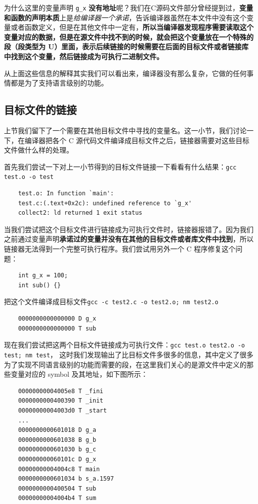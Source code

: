 \documentclass[UTF8,a4paper,12pt]{ctexbook}
\begin{document}
				为什么这里的变量声明 \verb|g_x| \textbf{没有地址}呢？我们在C源码文件部分曾经提到过，\textbf{变量和函数的声明本质}上是\textit{给编译器一个承诺}，告诉编译器虽然在本文件中没有这个变量或者函数定义，但是在其他文件中一定有，\textbf{所以当编译器发现程序需要读取这个变量对应的数据，但是在源文件中找不到的时候，就会把这个变量放在一个特殊的段（段类型为 U）里面，表示后续链接的时候需要在后面的目标文件或者链接库中找到这个变量，然后链接成为可执行二进制文件。}
				
				从上面这些信息的解释其实我们可以看出来，编译器没有那么复杂，它做的任何事情都是为了支持语言级别的功能。
				
			\subsection{目标文件的链接}
				上节我们留下了一个需要在其他目标文件中寻找的变量名。这一小节，我们讨论一下，在编译器把各个 C 源代码文件编译成目标文件之后，链接器需要对这些目标文件做什么样的处理。
				
				首先我们尝试一下对上一小节得到的目标文件链接一下看看有什么结果：\verb|gcc test.o -o test|
				\begin{lstlisting}
	test.o: In function `main':
	test.c:(.text+0x2c): undefined reference to `g_x'
	collect2: ld returned 1 exit status
				\end{lstlisting}
			
				当我们尝试把这个目标文件进行链接成为可执行文件时，链接器报错了。因为我们之前通过变量声明\textbf{承诺过的变量并没有在其他的目标文件或者库文件中找到}，所以链接器无法得到一个完整可执行程序。我们尝试用另外一个 C 程序修复这个问题：
				\begin{lstlisting}
	int g_x = 100;
	int sub() {}
				\end{lstlisting}
				
				把这个文件编译成目标文件\verb|gcc -c test2.c -o test2.o; nm test2.o|
				\begin{lstlisting}
	0000000000000000 D g_x
	0000000000000000 T sub
				\end{lstlisting}
				
				现在我们尝试把这两个目标文件链接成为可执行文件：\verb|gcc test.o test2.o -o test; nm test|， 这时我们发现输出了比目标文件多很多的信息，其中定义了很多为了实现不同语言级别的功能而需要的段，在这里我们关心的是源文件中定义的那些变量对应的 symbol 及其地址，如下图所示：
				\begin{lstlisting}
	00000000004005e8 T _fini
	0000000000400390 T _init
	00000000004003d0 T _start
	...
	0000000000601018 D g_a
	0000000000601038 B g_b
	0000000000601030 b g_c
	000000000060101c D g_x
	00000000004004c8 T main
	0000000000601034 b s_a.1597
	0000000000400504 T sub
	00000000004004b4 T sum
				\end{lstlisting}
				
\end{document}
